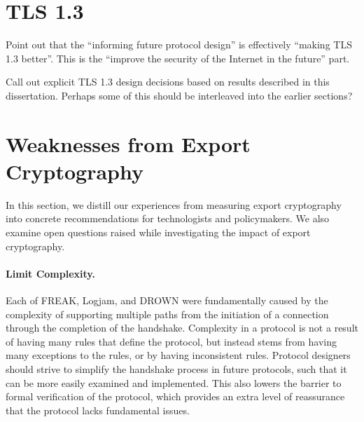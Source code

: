 
\section{TLS 1.3}

Point out that the ``informing future protocol design'' is effectively
``making TLS 1.3 better''. This is the ``improve the security of the Internet
in the future'' part.

Call out explicit TLS 1.3 design decisions based on results described in this
dissertation. Perhaps some of this should be interleaved into the earlier
sections?

%
%

\section{Weaknesses from Export Cryptography}

In this section, we distill our experiences from measuring export
cryptography into concrete recommendations for technologists and
policymakers. We also examine open questions raised while investigating the
impact of export cryptography.

\paragraph{Limit Complexity.}
Each of FREAK, Logjam, and DROWN were fundamentally caused by the complexity
of supporting multiple paths from the initiation of a connection through the
completion of the handshake. Complexity in a protocol is not a result of
having many rules that define the protocol, but instead stems from having
many exceptions to the rules, or by having inconsistent rules. Protocol
designers should strive to simplify the handshake process in future
protocols, such that it can be more easily examined and implemented. This
also lowers the barrier to formal verification of the protocol, which
provides an extra level of reassurance that the protocol lacks fundamental
issues.

